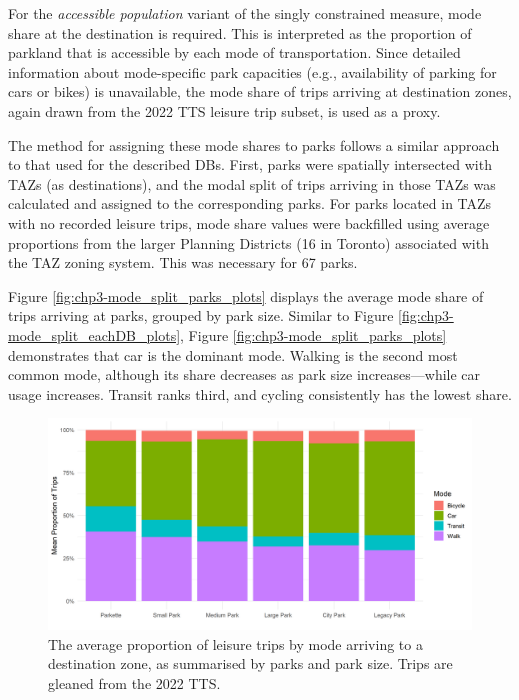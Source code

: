 \documentclass[
11pt, %
oneside, %
english, %
singlespacing, %
]{macthesis} %
\begin{document}
For the \emph{accessible population} variant of the singly constrained measure, mode share at the destination is required. This is interpreted as the proportion of parkland that is accessible by each mode of transportation. Since detailed information about mode-specific park capacities (e.g., availability of parking for cars or bikes) is unavailable, the mode share of trips arriving at destination zones, again drawn from the 2022 TTS leisure trip subset, is used as a proxy.

The method for assigning these mode shares to parks follows a similar approach to that used for the described DBs. First, parks were spatially intersected with TAZs (as destinations), and the modal split of trips arriving in those TAZs was calculated and assigned to the corresponding parks. For parks located in TAZs with no recorded leisure trips, mode share values were backfilled using average proportions from the larger Planning Districts (16 in Toronto) associated with the TAZ zoning system. This was necessary for 67 parks.

Figure \ref{fig:chp3-mode_split_parks_plots} displays the average mode share of trips arriving at parks, grouped by park size. Similar to Figure \ref{fig:chp3-mode_split_eachDB_plots}, Figure \ref{fig:chp3-mode_split_parks_plots} demonstrates that car is the dominant mode. Walking is the second most common mode, although its share decreases as park size increases---while car usage increases. Transit ranks third, and cycling consistently has the lowest share.

\begin{figure}

{\centering \includegraphics[width=6in]{./data/figures/chp3-mode_split_parks_plots} 

}

\caption{\label{fig:chp3-mode_split_parks_plots} The average proportion of leisure trips by mode arriving to a destination zone, as summarised by parks and park size. Trips are gleaned from the 2022 TTS. }\label{fig:unnamed-chunk-53}
\end{figure}
\end{document}
